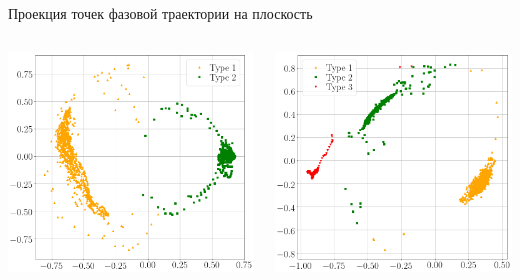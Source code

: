 \documentclass[10pt,pdf,hyperref={unicode}]{beamer}
\begin{document}
\begin{frame}[shrink=5]{Проекция точек фазовой траектории на плоскость}

\begin{columns}
    \begin{column}{0.35\textwidth}
        \includegraphics[width=1\textwidth]{results/2_patern_2_2D_vector}
    \end{column}
    \begin{column}{0.35\textwidth}
        \includegraphics[width=1\textwidth]{results/3_patern_2_2D_vector}
    \end{column}
\end{columns}


\end{frame}
\end{document}
